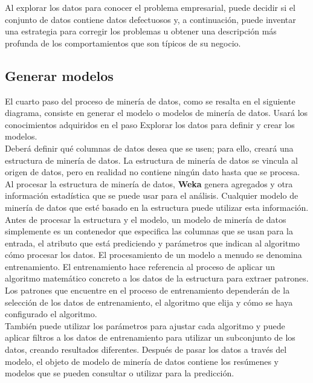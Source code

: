 \documentclass[a4paper, 11pt]{article} %
\begin{document}
Al explorar los datos para conocer el problema empresarial, puede decidir si el conjunto de datos contiene datos defectuosos y, a continuación, puede inventar una estrategia para corregir los problemas u obtener una descripción más profunda de los comportamientos que son típicos de su negocio.

\subsection*{Generar modelos}

El cuarto paso del proceso de minería de datos, como se resalta en el siguiente diagrama, consiste en generar el modelo o modelos de minería de datos. Usará los conocimientos adquiridos en el paso Explorar los datos para definir y crear los modelos.\\

Deberá definir qué columnas de datos desea que se usen; para ello, creará una estructura de minería de datos. La estructura de minería de datos se vincula al origen de datos, pero en realidad no contiene ningún dato hasta que se procesa. Al procesar la estructura de minería de datos, \textbf{Weka} genera agregados y otra información estadística que se puede usar para el análisis. Cualquier modelo de minería de datos que esté basado en la estructura puede utilizar esta información.\\

Antes de procesar la estructura y el modelo, un modelo de minería de datos simplemente es un contenedor que especifica las columnas que se usan para la entrada, el atributo que está prediciendo y parámetros que indican al algoritmo cómo procesar los datos. El procesamiento de un modelo a menudo se denomina entrenamiento. El entrenamiento hace referencia al proceso de aplicar un algoritmo matemático concreto a los datos de la estructura para extraer patrones. Los patrones que encuentre en el proceso de entrenamiento dependerán de la selección de los datos de entrenamiento, el algoritmo que elija y cómo se haya configurado el algoritmo.\\

También puede utilizar los parámetros para ajustar cada algoritmo y puede aplicar filtros a los datos de entrenamiento para utilizar un subconjunto de los datos, creando resultados diferentes. Después de pasar los datos a través del modelo, el objeto de modelo de minería de datos contiene los resúmenes y modelos que se pueden consultar o utilizar para la predicción.\\
\end{document}
